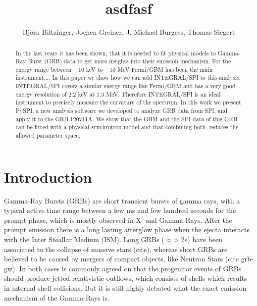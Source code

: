 \documentclass[twocolumn]{article}%
\begin{document}
\title{asdfasf}

\author{Björn Biltzinger, Jochen Greiner, J. Michael Burgess, Thomas Siegert}

\begin{abstract}
  In the last years it has been shown, that it is needed to fit physical models to Gamma-Ray Burst (GRB) data to get more insights into their emission mechanism. For the energy range between ~ 10 keV to ~ 10 MeV Fermi/GBM has been the main instrument.... In this paper we show how we can add INTEGRAL/SPI to this analysis. INTEGRAL/SPI covers a similar energy range like Fermi/GBM and has a very good energy resolution of 2.2 keV at 1.3 MeV. Therefore INTEGRAL/SPI is an ideal instrument to precisely measure the curvature of the spectrum. In this work we present PySPI, a new analysis software we developed to analyze GRB data from SPI, and apply it to the GRB 120711A. We show that the GBM and the SPI data of this GRB can be fitted with a physical synchrotron model and that combining both, reduces the allowed parameter space.

\end{abstract}

\section{Introduction}
Gamma-Ray Bursts (GRBs) are short transient bursts of gamma rays, with a typical active time range between a few ms and few hundred seconds for the prompt phase, which is mostly observed in X- and Gamma-Rays. After the prompt emission there is a long lasting afterglow phase when the ejecta interacts with the Inter Steallar Medium (ISM). Long GRBs ($\approx$> 2s) have been associated to the collapse of massive stars (cite), whereas short GRBs are believed to be caused by mergers of compact objects, like Neutron Stars (cite grb-gw). In both cases is commonly agreed on that the progenitor events of GRBs should produce jetted relativistic outflows, which consists of shells which results in internal shell collisions. But it is still highly debated what the exact emission mechanism of the Gamma-Rays is.
\end{document}
